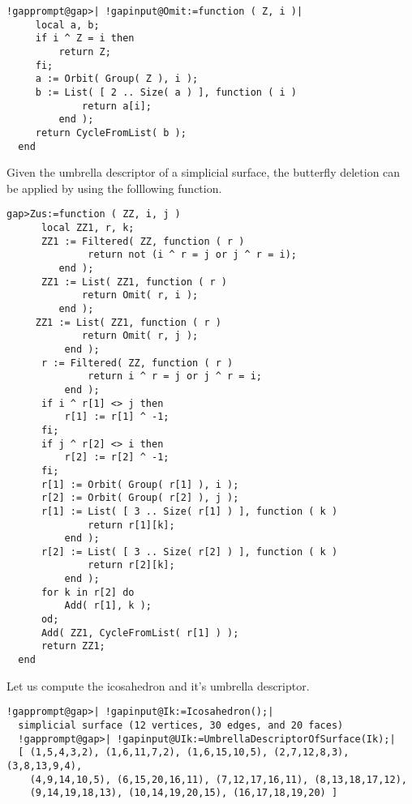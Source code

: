\documentclass[a4paper,11pt]{report}
\begin{document}
{{ 
\begin{center}

\end{center}
 

 
\begin{Verbatim}[commandchars=!@|,fontsize=\small,frame=single,label=Example]
  !gapprompt@gap>| !gapinput@Omit:=function ( Z, i )|
     local a, b;
     if i ^ Z = i then
         return Z;
     fi;
     a := Orbit( Group( Z ), i );
     b := List( [ 2 .. Size( a ) ], function ( i )
             return a[i];
         end );
     return CycleFromList( b );
  end
\end{Verbatim}
 

 Given the umbrella descriptor of a simplicial surface, the butterfly deletion
can be applied by using the folllowing function. 

 
\begin{Verbatim}[commandchars=!@|,fontsize=\small,frame=single,label=Example]
  gap>Zus:=function ( ZZ, i, j )
      local ZZ1, r, k;
      ZZ1 := Filtered( ZZ, function ( r )
              return not (i ^ r = j or j ^ r = i);
         end );
      ZZ1 := List( ZZ1, function ( r )
             return Omit( r, i );
         end );
     ZZ1 := List( ZZ1, function ( r )
             return Omit( r, j );
          end );
      r := Filtered( ZZ, function ( r )
              return i ^ r = j or j ^ r = i;
          end );
      if i ^ r[1] <> j then
          r[1] := r[1] ^ -1;
      fi;
      if j ^ r[2] <> i then
          r[2] := r[2] ^ -1;
      fi;
      r[1] := Orbit( Group( r[1] ), i );
      r[2] := Orbit( Group( r[2] ), j );
      r[1] := List( [ 3 .. Size( r[1] ) ], function ( k )
              return r[1][k];
          end );
      r[2] := List( [ 3 .. Size( r[2] ) ], function ( k )
              return r[2][k];
          end );
      for k in r[2] do
          Add( r[1], k );
      od;
      Add( ZZ1, CycleFromList( r[1] ) );
      return ZZ1;
  end
\end{Verbatim}
 

 Let us compute the icosahedron and it's umbrella descriptor. 

 
\begin{Verbatim}[commandchars=!@|,fontsize=\small,frame=single,label=Example]
  !gapprompt@gap>| !gapinput@Ik:=Icosahedron();|
  simplicial surface (12 vertices, 30 edges, and 20 faces)
  !gapprompt@gap>| !gapinput@UIk:=UmbrellaDescriptorOfSurface(Ik);|
  [ (1,5,4,3,2), (1,6,11,7,2), (1,6,15,10,5), (2,7,12,8,3), (3,8,13,9,4), 
    (4,9,14,10,5), (6,15,20,16,11), (7,12,17,16,11), (8,13,18,17,12), 
    (9,14,19,18,13), (10,14,19,20,15), (16,17,18,19,20) ]
\end{Verbatim}
 

}}
\end{document}
